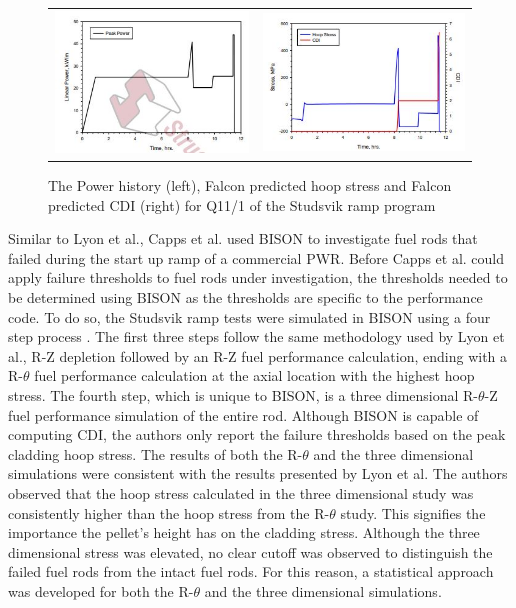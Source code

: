 \documentclass[edeposit,fullpage,11pt]{uiucthesis2009}
\begin{document}
\begin{figure}
\begin{tabular}{cc}
\includegraphics[width=0.5\linewidth]{./Figures/lyon_image_6.JPG} & \includegraphics[width=0.5\linewidth]{./Figures/lyon_image_7.JPG}
\end{tabular}
\caption{The Power history (left), Falcon predicted hoop stress and Falcon predicted CDI (right) for Q11/1 of the Studsvik ramp program \cite{lyon_pci_2009}}
\label{fig:paper_3_res}
\end{figure}


Similar to Lyon et al., Capps et al. \cite{capps_pci_2017} used BISON to investigate fuel rods that failed during the start up ramp of a commercial \gls{PWR}.
Before Capps et al. could apply failure thresholds to fuel rods under investigation, the thresholds needed to be determined using BISON as the thresholds are specific to the performance code.
To do so, the Studsvik ramp tests were simulated in BISON using a four step process \cite{killeen_experimental_2004}.
The first three steps follow the same methodology used by Lyon et al., R-Z depletion followed by an R-Z fuel performance calculation, ending with a R-$\theta$ fuel performance calculation at the axial location with the highest hoop stress.
The fourth step, which is unique to BISON, is a three dimensional R-$\theta$-Z fuel performance simulation of the entire rod. %
Although BISON is capable of computing \gls{CDI}, the authors only report the failure thresholds based on the peak cladding hoop stress.
The results of both the R-$\theta$ and the three dimensional simulations were consistent with the results presented by Lyon et al.
The authors observed that the hoop stress calculated in the three dimensional study was consistently higher than the hoop stress from the R-$\theta$ study.
This signifies the importance the pellet's height has on the cladding stress.
Although the three dimensional stress was elevated, no clear cutoff was observed to distinguish the failed fuel rods from the intact fuel rods.
For this reason, a statistical approach was developed for both the R-$\theta$ and the three dimensional simulations.
\end{document}
